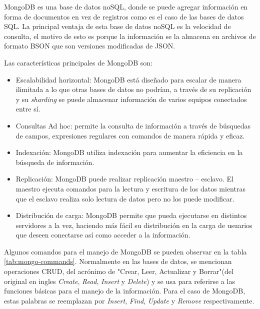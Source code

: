 MongoDB es una base de datos noSQL\citep{WEBSITE:22},  donde se puede agregar información en forma de documentos en vez de registros como es el caso de las bases de datos SQL\citep{WEBSITE:23}.  La principal ventaja de esta base de datos noSQL es la velocidad de consulta, el motivo de esto es porque la información se la almacena en archivos de formato BSON que son versiones modificadas de JSON. 

Las características principales de MongoDB son:

\begin{itemize}
	\item Escalabilidad horizontal: MongoDB está diseñado para escalar de manera ilimitada a lo que otras bases de datos no podrían, a través de su replicación \citep{WEBSITE:24} y su \textit{sharding}\citep{WEBSITE:25} se puede almacenar información de varios equipos conectados entre sí.
	
	\item Consultas Ad hoc: permite la consulta de información a través de búsquedas de campos,
expresiones regulares con comandos de manera rápida y eficaz.

	\item Indexación: MongoDB utiliza indexación para aumentar la eficiencia en la búsqueda de
información.

	\item Replicación: MongoDB puede realizar replicación maestro – esclavo. El maestro ejecuta comandos para la lectura y escritura de los datos mientras que el esclavo realiza solo lectura de datos pero no los puede modificar.
	
	\item Distribución de carga: MongoDB permite que pueda ejecutarse en distintos servidores a la vez, haciendo más fácil su distribución en la carga de usuarios que deseen conectarse así como acceder a la información. 
	
\end{itemize}




Algunos comandos para el manejo de MongoDB se pueden observar en la tabla \ref{tab:mongo-commands}.  Normalmente en las bases de datos, se mencionan operaciones CRUD,  del acrónimo de "Crear, Leer, Actualizar y Borrar"(del original en ingles \textit{Create}, \textit{Read}, \textit{Insert} y \textit{Delete}) y se usa para referirse a las funciones básicas para el manejo de la información. Para el caso de MongoDB,  estas palabras se reemplazan por \textit{Insert}, \textit{Find}, \textit{Update} y \textit{Remove} respectivamente.

